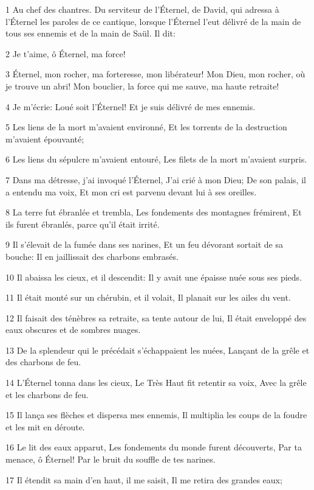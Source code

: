 \par 1 Au chef des chantres. Du serviteur de l'Éternel, de David, qui adressa à l'Éternel les paroles de ce cantique, lorsque l'Éternel l'eut délivré de la main de tous ses ennemis et de la main de Saül. Il dit:
\par 2 Je t'aime, ô Éternel, ma force!
\par 3 Éternel, mon rocher, ma forteresse, mon libérateur! Mon Dieu, mon rocher, où je trouve un abri! Mon bouclier, la force qui me sauve, ma haute retraite!
\par 4 Je m'écrie: Loué soit l'Éternel! Et je suis délivré de mes ennemis.
\par 5 Les liens de la mort m'avaient environné, Et les torrents de la destruction m'avaient épouvanté;
\par 6 Les liens du sépulcre m'avaient entouré, Les filets de la mort m'avaient surpris.
\par 7 Dans ma détresse, j'ai invoqué l'Éternel, J'ai crié à mon Dieu; De son palais, il a entendu ma voix, Et mon cri est parvenu devant lui à ses oreilles.
\par 8 La terre fut ébranlée et trembla, Les fondements des montagnes frémirent, Et ils furent ébranlés, parce qu'il était irrité.
\par 9 Il s'élevait de la fumée dans ses narines, Et un feu dévorant sortait de sa bouche: Il en jaillissait des charbons embrasés.
\par 10 Il abaissa les cieux, et il descendit: Il y avait une épaisse nuée sous ses pieds.
\par 11 Il était monté sur un chérubin, et il volait, Il planait sur les ailes du vent.
\par 12 Il faisait des ténèbres sa retraite, sa tente autour de lui, Il était enveloppé des eaux obscures et de sombres nuages.
\par 13 De la splendeur qui le précédait s'échappaient les nuées, Lançant de la grêle et des charbons de feu.
\par 14 L'Éternel tonna dans les cieux, Le Très Haut fit retentir sa voix, Avec la grêle et les charbons de feu.
\par 15 Il lança ses flèches et dispersa mes ennemis, Il multiplia les coups de la foudre et les mit en déroute.
\par 16 Le lit des eaux apparut, Les fondements du monde furent découverts, Par ta menace, ô Éternel! Par le bruit du souffle de tes narines.
\par 17 Il étendit sa main d'en haut, il me saisit, Il me retira des grandes eaux;
